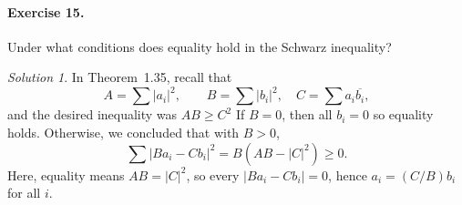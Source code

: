 \documentclass[11pt]{report}
\theoremstyle{remark}
\newtheorem*{solution}{Solution}
\begin{document}
    \paragraph{Exercise 15.} Under what conditions does equality hold in the Schwarz
    inequality?
    \begin{solution}
        In Theorem~1.35, recall that \[
            A = \sum |a_i|^2, \qquad B = \sum |b_i|^2, \quad C = \sum a_i
            \overline{b_i},   
        \] and the desired inequality was $AB \geq C^2$
        If $B = 0$, then all $b_i = 0$ so equality holds. Otherwise, we concluded
        that with $B > 0$, \[
            \sum |Ba_i - Cb_i|^2 = B(AB - |C|^2) \geq 0.
        \] Here, equality means $AB = |C|^2$, so every $|Ba_i - Cb_i| = 0$, hence
        $a_i = (C / B)b_i$ for all $i$.
    \end{solution}
    
\end{document}
